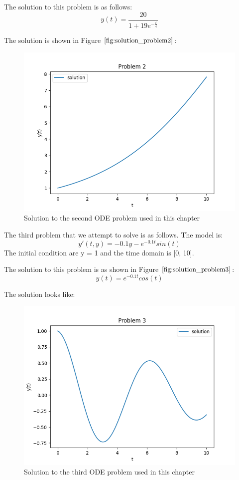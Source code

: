 \documentclass{article}
\begin{document}
The solution to this problem is as follows:
\begin{equation}
y(t) = \frac{20}{1 + 19e^{-\frac{t}{4}}}
\end{equation}

The solution is shown in Figure $\ref{fig:solution_problem2}$:
\begin{figure}[H]
\centering
\includegraphics[width=0.7\linewidth]{./figures/solution_problem2}
\caption{Solution to the second ODE problem used in this chapter}
\label{fig:solution_problem2}
\end{figure}

The third problem that we attempt to solve is as follows.
The model is:
\begin{equation}
y'(t, y) = -0.1y - e^{-0.1t}sin(t)
\end{equation}
The initial condition are y = 1 and the time domain is [0, 10].

The solution to this problem is as shown in Figure $\ref{fig:solution_problem3}$:
\begin{equation}
y(t) = e^{-0.1t}cos(t)
\end{equation}

The solution looks like:
\begin{figure}[H]
\centering
\includegraphics[width=0.7\linewidth]{./figures/solution_problem3}
\caption{Solution to the third ODE problem used in this chapter}
\label{fig:solution_problem3}
\end{figure}
\end{document}
